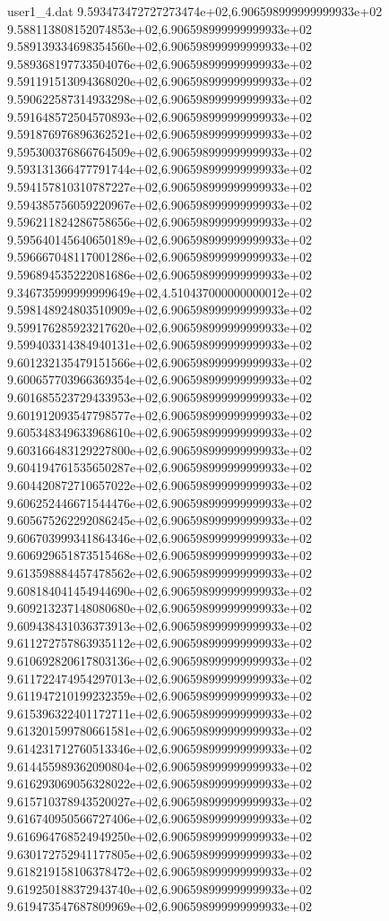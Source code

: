 \begin{filecontents}{user1_4.dat}
9.593473472727273474e+02,6.906598999999999933e+02
9.588113808152074853e+02,6.906598999999999933e+02
9.589139334698354560e+02,6.906598999999999933e+02
9.589368197733504076e+02,6.906598999999999933e+02
9.591191513094368020e+02,6.906598999999999933e+02
9.590622587314933298e+02,6.906598999999999933e+02
9.591648572504570893e+02,6.906598999999999933e+02
9.591876976896362521e+02,6.906598999999999933e+02
9.595300376866764509e+02,6.906598999999999933e+02
9.593131366477791744e+02,6.906598999999999933e+02
9.594157810310787227e+02,6.906598999999999933e+02
9.594385756059220967e+02,6.906598999999999933e+02
9.596211824286758656e+02,6.906598999999999933e+02
9.595640145640650189e+02,6.906598999999999933e+02
9.596667048117001286e+02,6.906598999999999933e+02
9.596894535222081686e+02,6.906598999999999933e+02
9.346735999999999649e+02,4.510437000000000012e+02
9.598148924803510909e+02,6.906598999999999933e+02
9.599176285923217620e+02,6.906598999999999933e+02
9.599403314384940131e+02,6.906598999999999933e+02
9.601232135479151566e+02,6.906598999999999933e+02
9.600657703966369354e+02,6.906598999999999933e+02
9.601685523729433953e+02,6.906598999999999933e+02
9.601912093547798577e+02,6.906598999999999933e+02
9.605348349633968610e+02,6.906598999999999933e+02
9.603166483129227800e+02,6.906598999999999933e+02
9.604194761535650287e+02,6.906598999999999933e+02
9.604420872710657022e+02,6.906598999999999933e+02
9.606252446671544476e+02,6.906598999999999933e+02
9.605675262292086245e+02,6.906598999999999933e+02
9.606703999341864346e+02,6.906598999999999933e+02
9.606929651873515468e+02,6.906598999999999933e+02
9.613598884457478562e+02,6.906598999999999933e+02
9.608184041454944690e+02,6.906598999999999933e+02
9.609213237148080680e+02,6.906598999999999933e+02
9.609438431036373913e+02,6.906598999999999933e+02
9.611272757863935112e+02,6.906598999999999933e+02
9.610692820617803136e+02,6.906598999999999933e+02
9.611722474954297013e+02,6.906598999999999933e+02
9.611947210199232359e+02,6.906598999999999933e+02
9.615396322401172711e+02,6.906598999999999933e+02
9.613201599780661581e+02,6.906598999999999933e+02
9.614231712760513346e+02,6.906598999999999933e+02
9.614455989362090804e+02,6.906598999999999933e+02
9.616293069056328022e+02,6.906598999999999933e+02
9.615710378943520027e+02,6.906598999999999933e+02
9.616740950566727406e+02,6.906598999999999933e+02
9.616964768524949250e+02,6.906598999999999933e+02
9.630172752941177805e+02,6.906598999999999933e+02
9.618219158106378472e+02,6.906598999999999933e+02
9.619250188372943740e+02,6.906598999999999933e+02
9.619473547687809969e+02,6.906598999999999933e+02

\end{filecontents}
